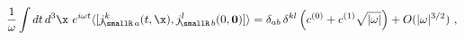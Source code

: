 \begin{equation}
\label{eq:JJ spectral density SYM}
     \frac{1 }{ \omega}
     \int dt\, d^3\x \ e^{i\omega t}
     \langle
     [j_{\!\smallR \, a}^k(t,\x), j_{\!\smallR \, b}^l(0,{\bf 0})]
     \rangle =
     \delta_{ab} \, \delta^{kl} \left( c^{(0)} +
     c^{(1)} \sqrt{|\omega|} \right) +
      O(|\omega|^{3/2}) \ ,
\end{equation}

